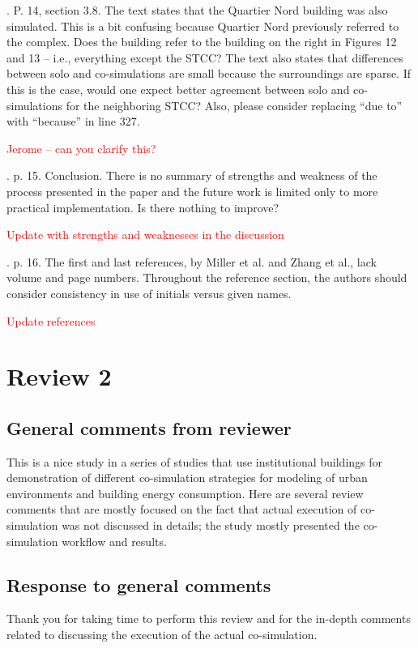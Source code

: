 \documentclass[answers,12pt]{exam}
\begin{document}
\begin{questions}
. P. 14, section 3.8.  The text states that the Quartier Nord building was also simulated. This is a bit confusing because Quartier Nord previously referred to the complex.  Does the building refer to the building on the right in Figures 12 and 13 – i.e., everything except the STCC?  The text also states that differences between solo and co-simulations are small because the surroundings are sparse.  If this is the case, would one expect better agreement between solo and co-simulations for the neighboring STCC?  Also, please consider replacing “due to” with “because” in line 327. 
\begin{solution}
\textcolor{red}{Jerome -- can you clarify this?}
\end{solution}

. p. 15.  Conclusion.  There is no summary of strengths and weakness of the process presented in the paper and the future work is limited only to more practical implementation.  Is there nothing to improve? 
\begin{solution}
\textcolor{red}{Update with strengths and weaknesses in the discussion}
\end{solution}

. p. 16. The first and last references, by Miller et al. and Zhang et al., lack volume and page numbers.  Throughout the reference section, the authors should consider consistency in use of initials versus given names.   
\begin{solution}
\textcolor{red}{Update references}
\end{solution}

\pagebreak
\section{Review 2}

\subsection{General comments from reviewer}
This is a nice study in a series of studies that use institutional buildings for demonstration of different co-simulation strategies for modeling of urban environments and building energy consumption. Here are several review comments that are mostly focused on the fact that actual execution of co-simulation was not discussed in details; the study mostly presented the co-simulation workflow and results. 


\subsection{Response to general comments}
\begin{solution}
Thank you for taking time to perform this review and for the in-depth comments related to discussing the execution of the actual co-simulation.
\end{solution}


\end{questions}
\end{document}
